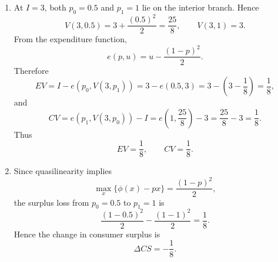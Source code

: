 \documentclass[12pt]{article}
\begin{document}
\begin{enumerate}[label=(\alph*)]
    \item
    At \(I=3\), both \(p_0=0.5\) and \(p_1=1\) lie on the interior branch. Hence
    \[
    V(3,0.5)=3+\frac{(0.5)^2}{2}=\frac{25}{8},
    \qquad
    V(3,1)=3.
    \]
    From the expenditure function,
    \[
    e(p,u)=u-\frac{(1-p)^2}{2}.
    \]
    Therefore
    \[
    EV
    =
    I-e(p_0,V(3,p_1))
    =
    3-e(0.5,3)
    =
    3-\left(3-\frac18\right)
    =
    \frac18,
    \]
    and
    \[
    CV
    =
    e(p_1,V(3,p_0))-I
    =
    e\!\left(1,\frac{25}{8}\right)-3
    =
    \frac{25}{8}-3
    =
    \frac18.
    \]
    Thus
    \[
    \boxed{EV=\frac18,\qquad CV=\frac18.}
    \]

    \item
    Since quasilinearity implies
    \[
    \max_x\{\phi(x)-px\}=\frac{(1-p)^2}{2},
    \]
    the surplus loss from \(p_0=0.5\) to \(p_1=1\) is
    \[
    \frac{(1-0.5)^2}{2}-\frac{(1-1)^2}{2}
    =\frac18.
    \]
    Hence the change in consumer surplus is
    \[
    \boxed{\Delta CS=-\frac18.}
    \]
\end{enumerate}

\newpage
\end{document}
